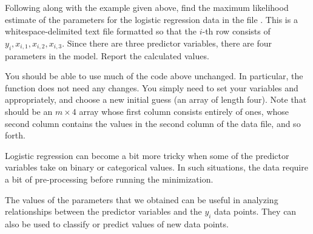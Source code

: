 \begin{problem}
Following along with the example given above, find the maximum likelihood estimate of the parameters for
the logistic regression data in the file . This is a whitespace-delimited text file
formatted so that the $i$-th row consists of $y_i, x_{i,1}, x_{i,2}, x_{i,3}.$ Since there are three
predictor variables, there are four parameters in the model. Report the calculated values.

You should be able to use much of the code above unchanged. In particular, the function  does
not need any changes. You simply need to set your variables  and  appropriately, and
choose a new initial guess (an array of length four). Note that  should be an $m \times 4$ array whose first
column consists entirely of ones, whose second column contains the values in the second column of the data file, 
and so forth.
\end{problem}

Logistic regression can become a bit more tricky when some of the predictor variables take on binary or categorical
values. In such situations, the data require a bit of pre-processing before running the minimization. 

The values of the parameters that we obtained can be useful in analyzing relationships
between the predictor variables and the $y_i$ data points. They can also be used to classify or predict values of new 
data points. 





